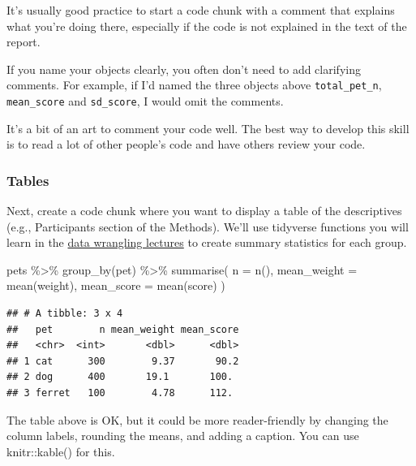 \documentclass[
  oneside]{book}
\newenvironment{Shaded}{\begin{snugshade}}{\end{snugshade}}
\newcommand{\AttributeTok}[1]{\textcolor[rgb]{0.77,0.63,0.00}{#1}}
\newcommand{\FunctionTok}[1]{\textcolor[rgb]{0.00,0.00,0.00}{#1}}
\newcommand{\NormalTok}[1]{#1}
\newcommand{\SpecialCharTok}[1]{\textcolor[rgb]{0.00,0.00,0.00}{#1}}
\begin{document}
It's usually good practice to start a code chunk with a comment that explains what you're doing there, especially if the code is not explained in the text of the report.

If you name your objects clearly, you often don't need to add clarifying comments. For example, if I'd named the three objects above \texttt{total\_pet\_n}, \texttt{mean\_score} and \texttt{sd\_score}, I would omit the comments.

It's a bit of an art to comment your code well. The best way to develop this skill is to read a lot of other people's code and have others review your code.

\hypertarget{tables}{%
\subsubsection{Tables}\label{tables}}

Next, create a code chunk where you want to display a table of the descriptives (e.g., Participants section of the Methods). We'll use tidyverse functions you will learn in the \protect\hyperlink{tidyr}{data wrangling lectures} to create summary statistics for each group.

\begin{Shaded}
\begin{Highlighting}[]
\NormalTok{pets }\SpecialCharTok{\%\textgreater{}\%}
  \FunctionTok{group\_by}\NormalTok{(pet) }\SpecialCharTok{\%\textgreater{}\%}
  \FunctionTok{summarise}\NormalTok{(}
    \AttributeTok{n =} \FunctionTok{n}\NormalTok{(),}
    \AttributeTok{mean\_weight =} \FunctionTok{mean}\NormalTok{(weight),}
    \AttributeTok{mean\_score =} \FunctionTok{mean}\NormalTok{(score)}
\NormalTok{  )}
\end{Highlighting}
\end{Shaded}

\begin{verbatim}
## # A tibble: 3 x 4
##   pet        n mean_weight mean_score
##   <chr>  <int>       <dbl>      <dbl>
## 1 cat      300        9.37       90.2
## 2 dog      400       19.1       100. 
## 3 ferret   100        4.78      112.
\end{verbatim}

The table above is OK, but it could be more reader-friendly by changing the column labels, rounding the means, and adding a caption. You can use {knitr}{::}{kable}{(}{)} for this.
\end{document}
